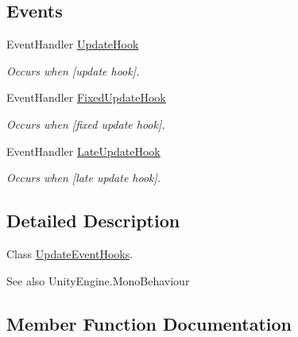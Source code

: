 \subsection*{Events}
\begin{DoxyCompactItemize}
\item 
Event\+Handler \hyperlink{class_lerp2_a_p_i_1_1_utility_1_1_update_event_hooks_ad883020c65023c5039dac40800bf9b01}{Update\+Hook}
\begin{DoxyCompactList}\small\item\em Occurs when \mbox{[}update hook\mbox{]}. \end{DoxyCompactList}\item 
Event\+Handler \hyperlink{class_lerp2_a_p_i_1_1_utility_1_1_update_event_hooks_abf495c700e912311f6153dd67a64072d}{Fixed\+Update\+Hook}
\begin{DoxyCompactList}\small\item\em Occurs when \mbox{[}fixed update hook\mbox{]}. \end{DoxyCompactList}\item 
Event\+Handler \hyperlink{class_lerp2_a_p_i_1_1_utility_1_1_update_event_hooks_a8ef9fbd48cf07a3cf0c68b792f63fea6}{Late\+Update\+Hook}
\begin{DoxyCompactList}\small\item\em Occurs when \mbox{[}late update hook\mbox{]}. \end{DoxyCompactList}\end{DoxyCompactItemize}


\subsection{Detailed Description}
Class \hyperlink{class_lerp2_a_p_i_1_1_utility_1_1_update_event_hooks}{Update\+Event\+Hooks}. 

\begin{DoxySeeAlso}{See also}
Unity\+Engine.\+Mono\+Behaviour


\end{DoxySeeAlso}


\subsection{Member Function Documentation}
\mbox{\label{class_lerp2_a_p_i_1_1_utility_1_1_update_event_hooks_a8637b48cca300cd9ce624b7f66fbc971}} 
